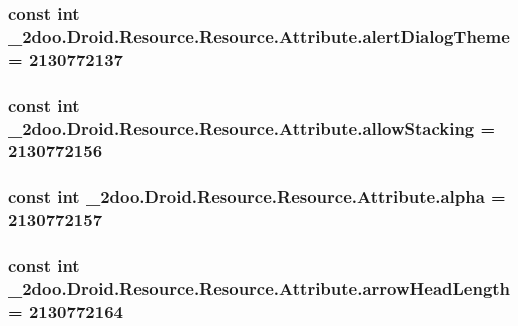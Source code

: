\hypertarget{class__2doo_1_1_droid_1_1_resource_1_1_attribute_93d9e31d4a976a9db5f426a26735248f}{
\subsubsection[{alertDialogTheme}]{\setlength{\rightskip}{0pt plus 5cm}const int \_\-2doo.Droid.Resource.Resource.Attribute.alertDialogTheme = 2130772137}}
\label{class__2doo_1_1_droid_1_1_resource_1_1_attribute_93d9e31d4a976a9db5f426a26735248f}


\hypertarget{class__2doo_1_1_droid_1_1_resource_1_1_attribute_f977fb44f18bc85a2e86c44c6747d7a0}{
\subsubsection[{allowStacking}]{\setlength{\rightskip}{0pt plus 5cm}const int \_\-2doo.Droid.Resource.Resource.Attribute.allowStacking = 2130772156}}
\label{class__2doo_1_1_droid_1_1_resource_1_1_attribute_f977fb44f18bc85a2e86c44c6747d7a0}


\hypertarget{class__2doo_1_1_droid_1_1_resource_1_1_attribute_ee0faaf23b4c66fa67721a7b2ee76cbc}{
\subsubsection[{alpha}]{\setlength{\rightskip}{0pt plus 5cm}const int \_\-2doo.Droid.Resource.Resource.Attribute.alpha = 2130772157}}
\label{class__2doo_1_1_droid_1_1_resource_1_1_attribute_ee0faaf23b4c66fa67721a7b2ee76cbc}


\hypertarget{class__2doo_1_1_droid_1_1_resource_1_1_attribute_6cd2df1e99515de4c9494e2330b57b51}{
\subsubsection[{arrowHeadLength}]{\setlength{\rightskip}{0pt plus 5cm}const int \_\-2doo.Droid.Resource.Resource.Attribute.arrowHeadLength = 2130772164}}
\label{class__2doo_1_1_droid_1_1_resource_1_1_attribute_6cd2df1e99515de4c9494e2330b57b51}


